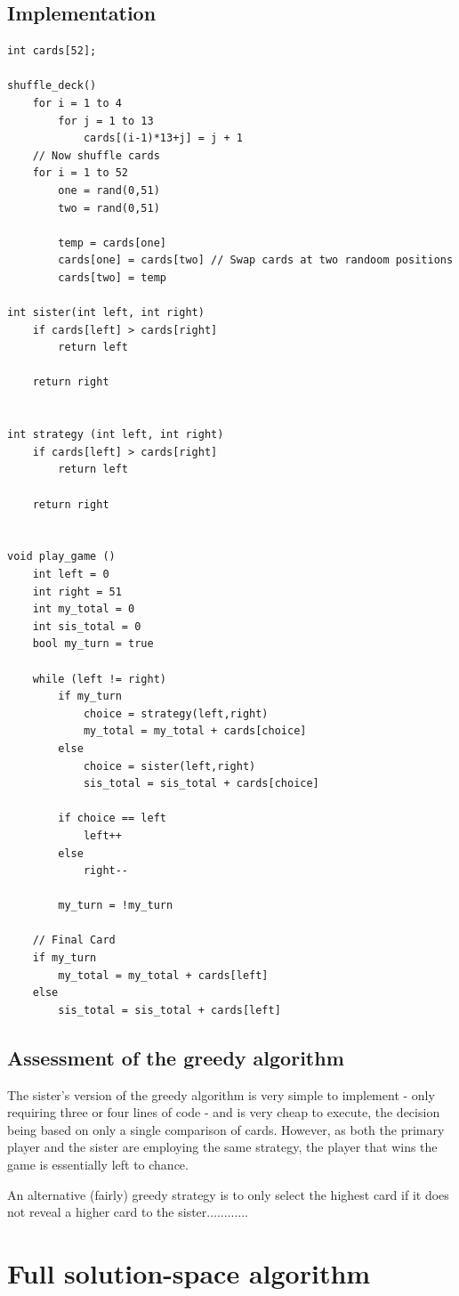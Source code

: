 \documentclass[11pt]{article}
\begin{document}
\subsection{Implementation}
\begin{lstlisting}
int cards[52];

shuffle_deck()
	for i = 1 to 4
		for j = 1 to 13
			cards[(i-1)*13+j] = j + 1
	// Now shuffle cards
	for i = 1 to 52
		one = rand(0,51)
		two = rand(0,51)

		temp = cards[one]
		cards[one] = cards[two] // Swap cards at two randoom positions
		cards[two] = temp

int sister(int left, int right)
	if cards[left] > cards[right]
		return left
	
	return right


int strategy (int left, int right)
	if cards[left] > cards[right]
		return left

	return right


void play_game ()
	int left = 0
	int right = 51
	int my_total = 0
	int sis_total = 0
	bool my_turn = true

	while (left != right)
		if my_turn
			choice = strategy(left,right)
			my_total = my_total + cards[choice]
		else
			choice = sister(left,right)
			sis_total = sis_total + cards[choice]

		if choice == left
			left++
		else
			right--

		my_turn = !my_turn

	// Final Card
	if my_turn
		my_total = my_total + cards[left]
	else
		sis_total = sis_total + cards[left]
\end{lstlisting}

\subsection{Assessment of the greedy algorithm}

The sister's version of the greedy algorithm is very simple to implement - only requiring three or four lines of code - and is very cheap to execute, the decision being based on only a single comparison of cards. However, as both the primary player and the sister are employing the same strategy, the player that wins the game is essentially left to chance.

An alternative (fairly) greedy strategy is to only select the highest card if it does not reveal a higher card to the sister............

\section{Full solution-space algorithm}
\end{document}
